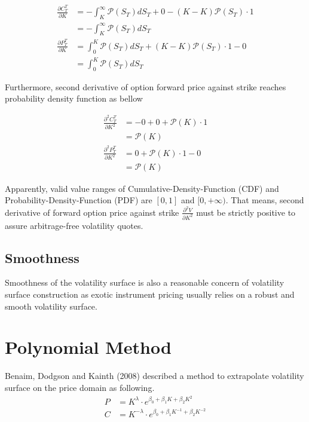 \documentclass{article}
\begin{document}
\begin{subequations}
    \begin{align}
        \frac{\partial C_T^T}{\partial K} &= -\int_{K}^{\infty}{\mathcal{P}(S_T) d S_T} + 0 - (K - K) \mathcal{P}(S_T) \cdot 1\nonumber \\
        &= -\int_{K}^{\infty}{\mathcal{P}(S_T) d S_T} \\
        \frac{\partial P_T^T}{\partial K} &= \int_{0}^{K}{\mathcal{P}(S_T) d S_T} + \left(K - K\right) \mathcal{P}(S_T) \cdot 1 - 0\nonumber \\
        &= \int_{0}^{K}{\mathcal{P}(S_T) d S_T}
    \end{align}
\end{subequations}

Furthermore, second derivative of option forward price against strike reaches probability density function as bellow

\begin{subequations}
    \begin{align}
        \frac{\partial^2 C_T^T}{\partial K^2} &= -0 + 0 + \mathcal{P}(K) \cdot 1 \nonumber \\
        &= \mathcal{P}(K) \\
        \frac{\partial^2 P_T^T}{\partial K^2} &= 0 + \mathcal{P}(K) \cdot 1 - 0 \nonumber \\
        &= \mathcal{P}(K)
    \end{align}
\end{subequations}

Apparently, valid value ranges of Cumulative-Density-Function (CDF) and Probability-Density-Function (PDF) are $ [0, 1] $ and $ [0, +\infty) $.
That means, second derivative of forward option price against strike $ \frac{\partial^2 V}{\partial K^2} $ must be strictly positive to assure arbitrage-free volatility quotes.

\subsection{Smoothness}
Smoothness of the volatility surface is also a reasonable concern of volatility surface construction as exotic instrument pricing usually relies on a robust and smooth volatility surface.


\section{Polynomial Method}

Benaim, Dodgson and Kainth (2008) described a method to extrapolate volatility surface on the price domain as following.
\begin{subequations}
    \begin{align}
        P &= K^{\lambda} \cdot e^{\beta_0 + \beta_1 K + \beta_2 K^2} \\
        C &= K^{-\lambda} \cdot e^{\beta_0 + \beta_1 K^{-1} + \beta_2 K^{-2}}
    \end{align}
\end{subequations}
\end{document}
